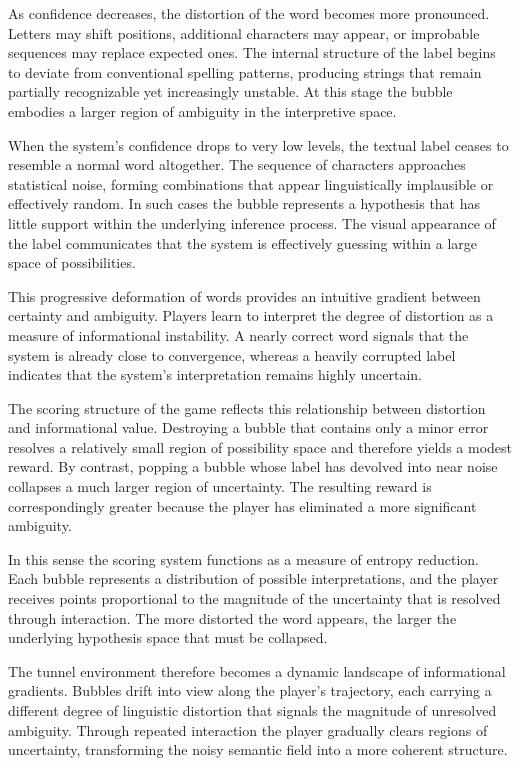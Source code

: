 \documentclass[11pt]{article}
\begin{document}
As confidence decreases, the distortion of the word becomes more pronounced. Letters may shift positions, additional characters may appear, or improbable sequences may replace expected ones. The internal structure of the label begins to deviate from conventional spelling patterns, producing strings that remain partially recognizable yet increasingly unstable. At this stage the bubble embodies a larger region of ambiguity in the interpretive space.

When the system's confidence drops to very low levels, the textual label ceases to resemble a normal word altogether. The sequence of characters approaches statistical noise, forming combinations that appear linguistically implausible or effectively random. In such cases the bubble represents a hypothesis that has little support within the underlying inference process. The visual appearance of the label communicates that the system is effectively guessing within a large space of possibilities.

This progressive deformation of words provides an intuitive gradient between certainty and ambiguity. Players learn to interpret the degree of distortion as a measure of informational instability. A nearly correct word signals that the system is already close to convergence, whereas a heavily corrupted label indicates that the system's interpretation remains highly uncertain.

The scoring structure of the game reflects this relationship between distortion and informational value. Destroying a bubble that contains only a minor error resolves a relatively small region of possibility space and therefore yields a modest reward. By contrast, popping a bubble whose label has devolved into near noise collapses a much larger region of uncertainty. The resulting reward is correspondingly greater because the player has eliminated a more significant ambiguity.

In this sense the scoring system functions as a measure of entropy reduction. Each bubble represents a distribution of possible interpretations, and the player receives points proportional to the magnitude of the uncertainty that is resolved through interaction. The more distorted the word appears, the larger the underlying hypothesis space that must be collapsed.

The tunnel environment therefore becomes a dynamic landscape of informational gradients. Bubbles drift into view along the player's trajectory, each carrying a different degree of linguistic distortion that signals the magnitude of unresolved ambiguity. Through repeated interaction the player gradually clears regions of uncertainty, transforming the noisy semantic field into a more coherent structure.
\end{document}
